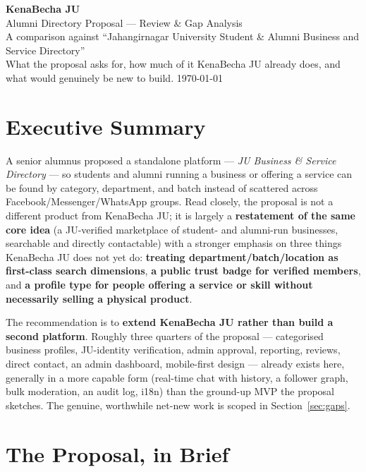 \documentclass[11pt]{article}
\begin{document}
\begin{titlepage}
  \centering
  \vspace*{3cm}
  {\Huge\bfseries\color{brandgreen} KenaBecha JU}\\[0.4cm]
  {\Large\color{darktext} Alumni Directory Proposal --- Review \& Gap Analysis}\\[0.3cm]
  {\large\color{graytext} A comparison against ``Jahangirnagar University Student \& Alumni Business and Service Directory''}\\[2cm]
  {\normalsize\color{graytext} What the proposal asks for, how much of it KenaBecha JU already does, and what would genuinely be new to build.}
  \vfill
  {\small\color{graytext} \today}
\end{titlepage}

\tableofcontents
\newpage

\section{Executive Summary}

A senior alumnus proposed a standalone platform --- \emph{JU Business \& Service Directory} --- so students and alumni running a business or offering a service can be found by category, department, and batch instead of scattered across Facebook/Messenger/WhatsApp groups. Read closely, the proposal is not a different product from KenaBecha JU; it is largely a \textbf{restatement of the same core idea} (a JU-verified marketplace of student- and alumni-run businesses, searchable and directly contactable) with a stronger emphasis on three things KenaBecha JU does not yet do: \textbf{treating department/batch/location as first-class search dimensions}, \textbf{a public trust badge for verified members}, and \textbf{a profile type for people offering a service or skill without necessarily selling a physical product}.

The recommendation is to \textbf{extend KenaBecha JU rather than build a second platform}. Roughly three quarters of the proposal --- categorised business profiles, JU-identity verification, admin approval, reporting, reviews, direct contact, an admin dashboard, mobile-first design --- already exists here, generally in a more capable form (real-time chat with history, a follower graph, bulk moderation, an audit log, i18n) than the ground-up MVP the proposal sketches. The genuine, worthwhile net-new work is scoped in Section~\ref{sec:gaps}.

\section{The Proposal, in Brief}
\end{document}
